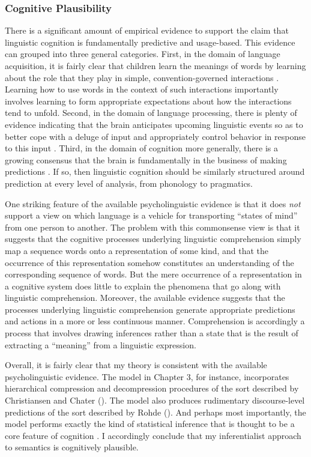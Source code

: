 \subsubsection{Cognitive Plausibility}

There is a significant amount of empirical evidence to support the claim that linguistic cognition is fundamentally predictive and usage-based. This evidence can grouped into three general categories. First, in the domain of language acquisition, it is fairly clear that children learn the meanings of words by learning about the role that they play in simple, convention-governed interactions \citep{Tomasello:2005,Tomasello:2001}. Learning how to use words in the context of such interactions importantly involves learning to form appropriate expectations about how the interactions tend to unfold. Second, in the domain of language processing, there is plenty of evidence indicating that the brain anticipates upcoming linguistic events so as to better cope with a deluge of input and appropriately control behavior in response to this input \citep{Christiansen:2015,Pickering:2007,Pickering:2013}. Third, in the domain of cognition more generally, there is a growing consensus that the brain is fundamentally in the business of making predictions \citep{clark:2013}. If so, then linguistic cognition should be similarly structured around prediction at every level of analysis, from phonology to pragmatics. 

One striking feature of the available psycholinguistic evidence is that it does \textit{not} support a view on which language is a vehicle for transporting ``states of mind'' from one person to another. The problem with this commonsense view is that it suggests that the cognitive processes underlying linguistic comprehension simply map a sequence words onto a representation of some kind, and that the occurrence of this representation somehow constitutes an understanding of the corresponding sequence of words. But the mere occurrence of a representation in a cognitive system does little to explain the phenomena that go along with linguistic comprehension. Moreover, the available evidence suggests that the processes underlying linguistic comprehension generate appropriate predictions and actions in a more or less continuous manner. Comprehension is accordingly a process that involves drawing inferences rather than a state that is the result of extracting a ``meaning'' from a linguistic expression.

Overall, it is fairly clear that my theory is consistent with the available psycholinguistic evidence. The model in Chapter 3, for instance, incorporates hierarchical compression and decompression procedures of the sort described by Christiansen and Chater (\citeyear{Christiansen:2015}). The model also produces rudimentary discourse-level predictions of the sort described by Rohde (\citeyear{Rohde:2008}). And perhaps most importantly, the model performs exactly the kind of statistical inference that is thought to be a core feature of cognition \citep{Eliasmith:2007,clark:2013}. I accordingly conclude that my inferentialist approach to semantics is cognitively plausible.  

